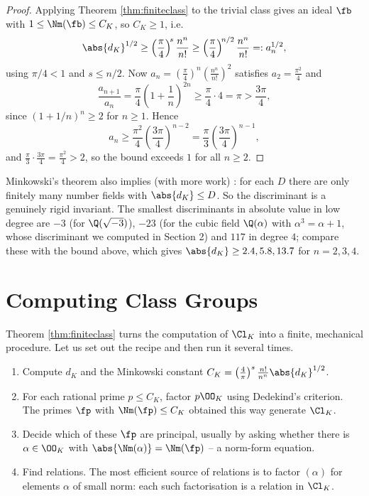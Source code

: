\begin{proof}
	Applying Theorem \ref{thm:finiteclass} to the trivial class gives an ideal $\fb$ with $1 \le \Nm(\fb)\le C_K$, so $C_K \ge 1$, i.e.
	$$\abs{d_K}^{1/2} \ge \left(\frac\pi4\right)^{\!s}\frac{n^n}{n!} \ge \left(\frac\pi4\right)^{\!n/2}\frac{n^n}{n!} =: a_n^{1/2},$$
	using $\pi/4 < 1$ and $s \le n/2$. Now $a_n = \left(\frac\pi4\right)^{n}\left(\frac{n^n}{n!}\right)^2$ satisfies $a_2 = \frac{\pi^2}{4}$ and
	$$\frac{a_{n+1}}{a_n} = \frac\pi4\left(1+\frac1n\right)^{2n} \ge \frac{\pi}{4}\cdot 4 = \pi > \frac{3\pi}{4},$$
	since $(1+1/n)^n \ge 2$ for $n \ge 1$. Hence
	$$a_n \ge \frac{\pi^2}{4}\left(\frac{3\pi}{4}\right)^{n-2} = \frac\pi3\left(\frac{3\pi}{4}\right)^{n-1},$$
	and $\frac\pi3\cdot\frac{3\pi}{4} = \frac{\pi^2}{4} > 2$, so the bound exceeds $1$ for all $n \ge 2$.
\end{proof}

\begin{remark}
	Minkowski's theorem also implies (with more work) : for each $D$ there are only finitely many number fields with $\abs{d_K}\le D$. So the discriminant is a genuinely rigid invariant. The smallest discriminants in absolute value in low degree are $-3$ (for $\Q(\sqrt{-3})$), $-23$ (for the cubic field $\Q(\alpha)$ with $\alpha^3=\alpha+1$, whose discriminant we computed in Section 2) and $117$ in degree $4$; compare these with the bound above, which gives $\abs{d_K} \geq 2.4, 5.8, 13.7$ for $n = 2,3,4$.
\end{remark}

\section{Computing Class Groups}\label{sec:computing}

Theorem \ref{thm:finiteclass} turns the computation of $\Cl_K$ into a finite, mechanical procedure. Let us set out the recipe and then run it several times.

\begin{enumerate}[label=(\arabic*)]
	\item Compute $d_K$ and the Minkowski constant $C_K = \left(\tfrac4\pi\right)^s\tfrac{n!}{n^n}\abs{d_K}^{1/2}$.
	\item For each rational prime $p \le C_K$, factor $p\OO_K$ using Dedekind's criterion. The primes $\fp$ with $\Nm(\fp) \le C_K$ obtained this way generate $\Cl_K$.
	\item Decide which of these $\fp$ are principal, usually by asking whether there is $\alpha \in \OO_K$ with $\abs{\Nm(\alpha)} = \Nm(\fp)$ -- a norm-form equation.
	\item Find relations. The most efficient source of relations is to factor $(\alpha)$ for elements $\alpha$ of small norm: each such factorisation is a relation in $\Cl_K$.
\end{enumerate}

